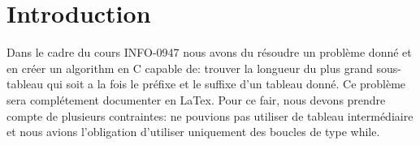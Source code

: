 \section{Introduction}\label{introduction}

Dans le cadre du cours INFO-0947
nous avons du résoudre un problème donné et en créer un algorithm en C capable de:
trouver la longueur du plus grand sous-tableau qui soit a la fois le préfixe et le suffixe d'un tableau donné.
Ce problème sera complétement documenter en LaTex.
Pour ce fair, nous devons prendre compte de plusieurs contraintes:
ne pouvions pas utiliser de tableau intermédiaire
et nous avions l'obligation d'utiliser uniquement des boucles de type while.

